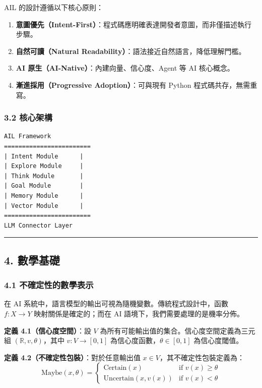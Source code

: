 AIL 的設計遵循以下核心原則：

\begin{enumerate}
\def\labelenumi{\arabic{enumi}.}
\tightlist
\item
  \textbf{意圖優先（Intent-First）}：程式碼應明確表達開發者意圖，而非僅描述執行步驟。
\item
  \textbf{自然可讀（Natural
  Readability）}：語法接近自然語言，降低理解門檻。
\item
  \textbf{AI 原生（AI-Native）}：內建向量、信心度、Agent 等 AI
  核心概念。
\item
  \textbf{漸進採用（Progressive Adoption）}：可與現有 Python
  程式碼共存，無需重寫。
\end{enumerate}

\subsubsection{3.2 核心架構}\label{ux6838ux5fc3ux67b6ux69cb}

\begin{verbatim}
AIL Framework
========================
| Intent Module      |
| Explore Module     |
| Think Module       |
| Goal Module        |
| Memory Module      |
| Vector Module      |
========================
LLM Connector Layer
\end{verbatim}

\begin{center}\rule{0.5\linewidth}{0.5pt}\end{center}

\subsection{4. 數學基礎}\label{ux6578ux5b78ux57faux790e}

\subsubsection{4.1
不確定性的數學表示}\label{ux4e0dux78baux5b9aux6027ux7684ux6578ux5b78ux8868ux793a}

在 AI 系統中，語言模型的輸出可視為隨機變數。傳統程式設計中，函數
\(f: X \to Y\) 映射關係是確定的；而在 AI
語境下，我們需要處理的是機率分佈。

\textbf{定義 4.1（信心度空間）}：設 \(V\)
為所有可能輸出值的集合。信心度空間定義為三元組
\((\mathbb{R}, v, \theta)\)，其中 \(v: V \to [0, 1]\)
為信心度函數，\(\theta \in [0, 1]\) 為信心度閾值。

\textbf{定義 4.2（不確定性包裝）}：對於任意輸出值
\(x \in V\)，其不確定性包裝定義為：
\[\text{Maybe}(x, \theta) = \begin{cases} 
\text{Certain}(x) & \text{if } v(x) \geq \theta \\
\text{Uncertain}(x, v(x)) & \text{if } v(x) < \theta
\end{cases}\]

